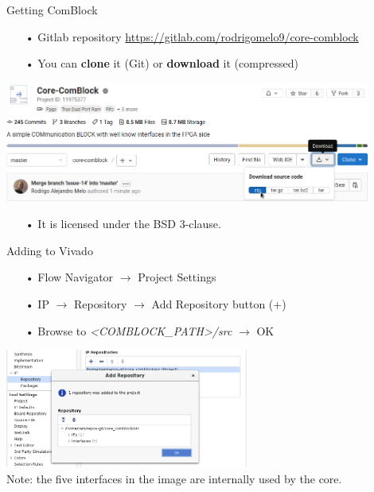 \documentclass[aspectratio=169]{beamer}
\begin{document}

\begin{frame}{Getting ComBlock}
  \begin{itemize}
    \scriptsize
    \item[•] Gitlab repository \url{https://gitlab.com/rodrigomelo9/core-comblock}
    \item[•] You can \textbf{clone} it (Git) or \textbf{download} it (compressed)
  \end{itemize}
  \center
  \includegraphics[width=0.9\textwidth]{../images/repo.png}
  \begin{itemize}
    \scriptsize
    \item[•] It is licensed under the BSD 3-clause.
  \end{itemize}
\end{frame}


\begin{frame}{Adding to Vivado}
  \begin{itemize}
    \scriptsize
    \item[•] Flow Navigator $\rightarrow$ Project Settings
    \item[•] IP $\rightarrow$ Repository $\rightarrow$ Add Repository button (+)
    \item[•] Browse to \textit{<COMBLOCK\_PATH>/src} $\rightarrow$ OK
  \end{itemize}
  \center
  \includegraphics[width=0.6\textwidth]{../vivado/guide/add-repo.png} \\
  \tiny
  Note: the five interfaces in the image are internally used by the core.
\end{frame}
\end{document}
